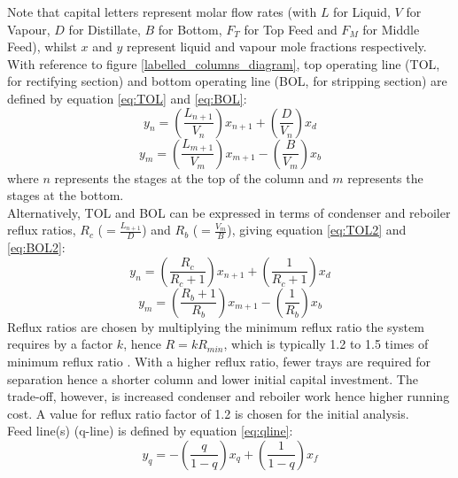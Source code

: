         \noindent Note that capital letters represent molar flow rates (with $L$ for Liquid, $V$ for Vapour, $D$ for Distillate, $B$ for Bottom, $F_T$ for Top Feed and $F_M$ for Middle Feed), whilst $x$ and $y$ represent liquid and vapour mole fractions respectively. \\
        With reference to figure \ref{labelled_columns_diagram}, top operating line (TOL, for rectifying section) and bottom operating line (BOL, for stripping section) are defined by equation \ref{eq:TOL} and \ref{eq:BOL}:
        \begin{equation}
            y_n = \left(\frac{L_{n+1}}{V_n}\right)x_{n+1} + \left(\frac{D}{V_n}\right)x_d
            \label{eq:TOL}
        \end{equation}
        \begin{equation}
            y_m = \left(\frac{L_{m+1}}{V_m}\right)x_{m+1} - \left(\frac{B}{V_m}\right)x_b
            \label{eq:BOL}
        \end{equation}
        where $n$ represents the stages at the top of the column and $m$ represents the stages at the bottom. \\
        Alternatively, TOL and BOL can be expressed in terms of condenser and reboiler reflux ratios, $R_c$ ($=\frac{L_{n+1}}{D}$) and $R_b$ ($=\frac{V_m}{B}$), giving equation \ref{eq:TOL2} and \ref{eq:BOL2}: \\
        \begin{equation}
            y_n = \left(\frac{R_c}{R_c+1}\right)x_{n+1} + \left(\frac{1}{R_c+1}\right)x_d
            \label{eq:TOL2}
        \end{equation}
        \begin{equation}
            y_m = \left(\frac{R_b+1}{R_b}\right)x_{m+1} - \left(\frac{1}{R_b}\right)x_b
            \label{eq:BOL2}
        \end{equation}
        Reflux ratios are chosen by multiplying the minimum reflux ratio the system requires by a factor $k$, hence $R=kR_{min}$, which is typically 1.2 to 1.5 times of minimum reflux ratio \citep{treybal2004}. With a higher reflux ratio, fewer trays are required for separation hence a shorter column and lower initial capital investment. The trade-off, however, is increased condenser and reboiler work hence higher running cost. A value for reflux ratio factor of 1.2 is chosen for the initial analysis. \\
        Feed line(s) (q-line) is defined by equation \ref{eq:qline}:
        \begin{equation}
            y_q = -\left(\frac{q}{1-q}\right)x_q + \left(\frac{1}{1-q}\right)x_f
            \label{eq:qline}
        \end{equation}
